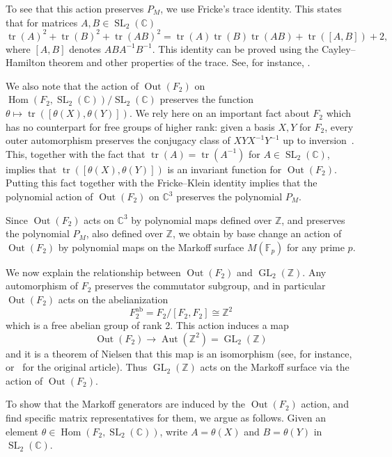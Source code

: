 \documentclass[AHL, Unicode, longabstracts, published]{cedram}
\newcommand{\Z}{\mathbb{Z}}
\newcommand{\CC}{\mathbb{C}}
\newcommand{\F}{\mathbb{F}}
\DeclareMathOperator{\tr}{tr}
\DeclareMathOperator{\GL}{GL}
\DeclareMathOperator{\SL}{SL}
\DeclareMathOperator{\Hom}{Hom}
\DeclareMathOperator{\Aut}{Aut}
\DeclareMathOperator{\Out}{Out}
\DeclareMathOperator{\GL}{GL}
\newcommand{\Z}{\mathbb{Z}}
\begin{document}
To see that this action preserves $P_M$, we use Fricke's trace identity. This states that for matrices $A,B \in \SL_2(\CC)$
\[
\tr(A)^2 + \tr(B)^2 + \tr(AB)^2 = \tr(A)\tr(B)\tr(AB) + \tr([A,B]) + 2,
\]
where $[A,B]$ denotes $ABA^{-1}B^{-1}$. This identity can be proved using the Cayley--Hamilton theorem and other properties of the trace. See, for instance, \cite[Proposition~4.3]{A}.


We also note that the action of $\Out(F_2)$ on $\Hom(F_{2},\SL_{2}(\CC))/\SL_{2}(\CC)$ preserves the function $\theta\mapsto\tr([\theta(X), \theta(Y)])$. We rely here on an important fact about $F_2$ which has no counterpart for free groups of higher rank: given a basis $X,Y$ for $F_2$, every outer automorphism preserves the conjugacy class of $XYX^{-1}Y^{-1}$ up to inversion~\cite{N}. This, together with the fact that $\tr(A) = \tr(A^{-1})$ for $A \in \SL_2(\CC)$, implies that $\tr([\theta(X), \theta(Y)])$ is an invariant function for $\Out(F_2)$. Putting this fact together with the Fricke--Klein identity implies that the polynomial action of $\Out(F_2)$ on $\CC^3$ preserves the polynomial $P_M$.

Since $\Out(F_2)$ acts on $\CC^3$ by polynomial maps defined over $\Z$, and preserves the polynomial $P_M$, also defined over $\Z$, we obtain by base change an action of $\Out(F_2)$ by polynomial maps on the Markoff surface $M(\F_p)$ for any prime $p$.
\goodbreak

We now explain the relationship between $\Out(F_2)$ and $\GL_2(\Z)$. Any automorphism of $F_2$ preserves the commutator subgroup, and in particular $\Out(F_2)$ acts on the abelianization
\[
F_2^{\text{ab}} = F_2/[F_2,F_2] \cong \Z^2
\]
which is a free abelian group of rank 2. This action induces a map
\[
\Out(F_2) \rightarrow \Aut(\Z^2) = \GL_2(\Z)
\]
and it is a theorem of Nielsen that this map is an isomorphism (see, for instance, \cite[Theorem~6.24]{A} or~\cite{N} for the original article). Thus $\GL_2(\Z)$ acts on the Markoff surface via the action of $\Out(F_2)$.

To show that the Markoff generators are induced by the $\Out(F_2)$ action, and find specific matrix representatives for them, we argue as follows. Given an element $\theta \in \Hom(F_2, \SL_2(\CC))$, write $A=\theta(X)$ and $B = \theta(Y)$ in $\SL_2(\CC)$.
\end{document}
